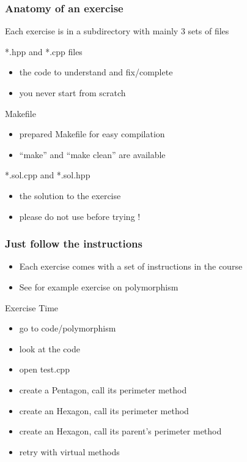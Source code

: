 \documentclass[compress]{beamer}
\begin{document}
\begin{frame}
  \frametitle{Anatomy of an exercise}
  Each exercise is in a subdirectory with mainly 3 sets of files
  \begin{exampleblock}{*.hpp and *.cpp files}
    \begin{itemize}
    \item the code to understand and fix/complete
    \item you never start from scratch
    \end{itemize}
  \end{exampleblock}
  \begin{block}{Makefile}
    \begin{itemize}
    \item prepared Makefile for easy compilation
    \item ``make'' and ``make clean'' are available
    \end{itemize}
  \end{block}
  \begin{alertblock}{*.sol.cpp and *.sol.hpp}
    \begin{itemize}
    \item the solution to the exercise
    \item please do not use before trying !
    \end{itemize}
  \end{alertblock}
\end{frame}

\begin{frame}
  \frametitle{Just follow the instructions}
  \begin{itemize}
  \item Each exercise comes with a set of instructions in the course
  \item See for example exercise on polymorphism
  \end{itemize}
  \begin{alertblock}{Exercise Time}
    \begin{itemize}
    \item go to code/polymorphism
    \item look at the code
    \item open test.cpp
    \item create a Pentagon, call its perimeter method
    \item create an Hexagon, call its perimeter method
    \item create an Hexagon, call its parent's perimeter method
    \item retry with virtual methods
    \end{itemize}
  \end{alertblock}
\end{frame}
\end{document}

